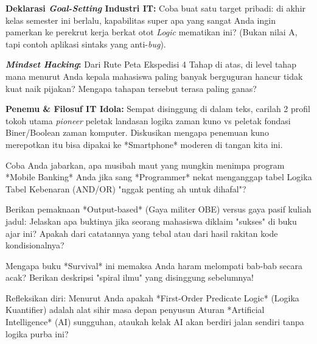 \documentclass[../main]{subfiles}
\begin{document}





\begin{aktivitas}
  \item \textbf{Deklarasi \textit{Goal-Setting} Industri IT:} Coba buat satu target pribadi: di akhir kelas semester ini berlalu, kapabilitas super apa yang sangat Anda ingin pamerkan ke perekrut kerja berkat otot \textit{Logic} mematikan ini? (Bukan nilai A, tapi contoh aplikasi sintaks yang anti-\textit{bug}).
  \item \textbf{\textit{Mindset Hacking}:} Dari Rute Peta Ekspedisi 4 Tahap di atas, di level tahap mana menurut Anda kepala mahasiswa paling banyak berguguran hancur tidak kuat naik pijakan? Mengapa tahapan tersebut terasa paling ganas?
  \item \textbf{Penemu \& Filosuf IT Idola:} Sempat disinggung di dalam teks, carilah 2 profil tokoh utama \textit{pioneer} peletak landasan logika zaman kuno vs peletak fondasi Biner/Boolean zaman komputer. Diskusikan mengapa penemuan kuno merepotkan itu bisa dipakai ke *Smartphone* moderen di tangan kita ini.
\end{aktivitas}

\begin{latihan}
  \item Coba Anda jabarkan, apa musibah maut yang mungkin menimpa program *Mobile Banking* Anda jika sang *Programmer* nekat menganggap tabel Logika Tabel Kebenaran (AND/OR) "nggak penting ah untuk dihafal"?
  \item Berikan pemaknaan *Output-based* (Gaya militer OBE) versus gaya pasif kuliah jadul: Jelaskan apa buktinya jika seorang mahasiswa diklaim "sukses" di buku ajar ini? Apakah dari catatannya yang tebal atau dari hasil rakitan kode kondisionalnya?
  \item Mengapa buku *Survival* ini memaksa Anda haram melompati bab-bab secara acak? Berikan deskripsi "spiral ilmu" yang disinggung sebelumnya!
  \item Refleksikan diri: Menurut Anda apakah *First-Order Predicate Logic* (Logika Kuantifier) adalah alat sihir masa depan penyusun Aturan *Artificial Intelligence* (AI) sungguhan, ataukah kelak AI akan berdiri jalan sendiri tanpa logika purba ini?
\end{latihan}
\end{document}

